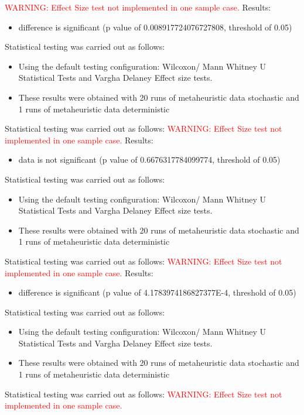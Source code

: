 \documentclass[]{article}
\begin{document}
\textcolor{Red}{WARNING: Effect Size test not implemented in one sample case.
}
Results:
\begin{itemize}
\item{difference is significant (p value of 0.008917724076727808, threshold of 0.05)}
\end{itemize}Statistical testing was carried out as follows: \begin{itemize}
\item{Using the default testing configuration: Wilcoxon/ Mann Whitney U Statistical Tests and Vargha Delaney Effect size tests.}
\item{These results were obtained with 20 runs of metaheuristic data stochastic and 1 runs of metaheuristic data deterministic}
\end{itemize}Statistical testing was carried out as follows: 
\textcolor{Red}{WARNING: Effect Size test not implemented in one sample case.
}
Results:
\begin{itemize}
\item{data is not significant (p value of 0.6676317784099774, threshold of 0.05)}
\end{itemize}Statistical testing was carried out as follows: \begin{itemize}
\item{Using the default testing configuration: Wilcoxon/ Mann Whitney U Statistical Tests and Vargha Delaney Effect size tests.}
\item{These results were obtained with 20 runs of metaheuristic data stochastic and 1 runs of metaheuristic data deterministic}
\end{itemize}Statistical testing was carried out as follows: 
\textcolor{Red}{WARNING: Effect Size test not implemented in one sample case.
}
Results:
\begin{itemize}
\item{difference is significant (p value of 4.1783974186827377E-4, threshold of 0.05)}
\end{itemize}Statistical testing was carried out as follows: \begin{itemize}
\item{Using the default testing configuration: Wilcoxon/ Mann Whitney U Statistical Tests and Vargha Delaney Effect size tests.}
\item{These results were obtained with 20 runs of metaheuristic data stochastic and 1 runs of metaheuristic data deterministic}
\end{itemize}Statistical testing was carried out as follows: 
\textcolor{Red}{WARNING: Effect Size test not implemented in one sample case.
}
\end{document}
